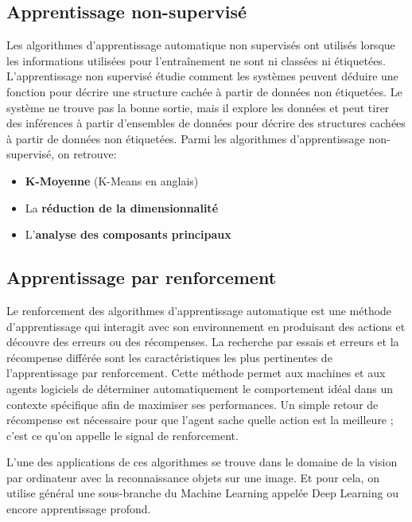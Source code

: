     \subsection{Apprentissage non-supervisé}
    Les algorithmes d'apprentissage automatique non supervisés ont utilisés lorsque les informations utilisées pour l'entraînement ne sont ni classées ni étiquetées. L'apprentissage non supervisé étudie comment les systèmes peuvent déduire une fonction pour décrire une structure cachée à partir de données non étiquetées. Le système ne trouve pas la bonne sortie, mais il explore les données et peut tirer des inférences à partir d'ensembles de données pour décrire des structures cachées à partir de données non étiquetées.\cite{expertAi}
    Parmi les algorithmes d'apprentissage non-supervisé, on retrouve:
        \begin{itemize}
            \item \textbf{K-Moyenne} (K-Means en anglais)
            \item La \textbf{réduction de la dimensionnalité}
            \item L'\textbf{analyse des composants principaux}
        \end{itemize}

    \subsection{Apprentissage par renforcement}
    Le renforcement des algorithmes d'apprentissage automatique est une méthode d'apprentissage qui interagit avec son environnement en produisant des actions et découvre des erreurs ou des récompenses. La recherche par essais et erreurs et la récompense différée sont les caractéristiques les plus pertinentes de l'apprentissage par renforcement. Cette méthode permet aux machines et aux agents logiciels de déterminer automatiquement le comportement idéal dans un contexte spécifique afin de maximiser ses performances. Un simple retour de récompense est nécessaire pour que l'agent sache quelle action est la meilleure ; c'est ce qu'on appelle le signal de renforcement.\cite{expertAi}




L’une des applications de ces algorithmes se trouve dans le domaine de la vision par ordinateur avec la reconnaissance objets sur une image. Et pour cela, on utilise général une sous-branche du Machine Learning appelée Deep Learning ou encore apprentissage profond.